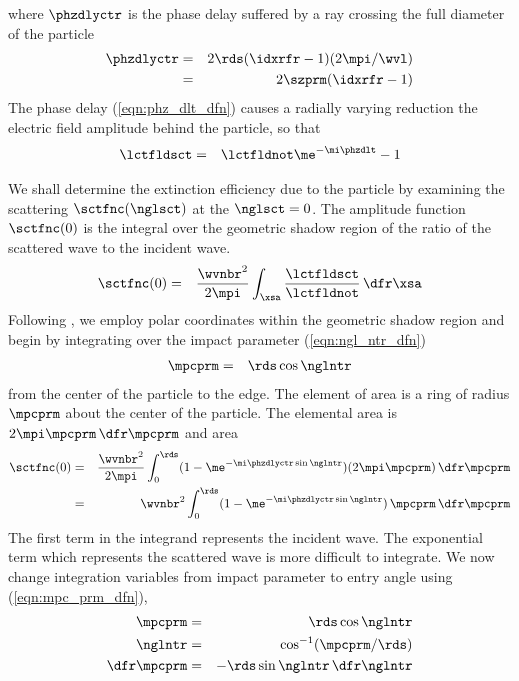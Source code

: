 \documentclass[12pt]{article}
\begin{document}
where $\phzdlyctr$ is the phase delay suffered by a ray crossing the
full diameter of the particle
\begin{eqnarray}
\phzdlyctr & = & 2 \rds (\idxrfr - 1 ) (2 \mpi / \wvl) \nonumber \\
& = & 2 \szprm (\idxrfr - 1 )
\label{eqn:phz_dly_ctr}
\end{eqnarray}
The phase delay (\ref{eqn:phz_dlt_dfn}) causes a radially varying
reduction the electric field amplitude behind the particle, so that
\begin{eqnarray}
\lctfldsct & = & \lctfldnot \me^{-\mi \phzdlt} - 1
\label{eqn:lct_fld_sct_adt_dfn}
\end{eqnarray}

We shall determine the extinction efficiency due to the particle
by examining the scattering  
$\sctfnc(\nglsct)$ at the  $\nglsct = 0$.
The amplitude function $\sctfnc(0)$ is the integral over the geometric
shadow region of the ratio of the scattered wave to the incident wave.
\begin{eqnarray}
\sctfnc(0) & = & \frac{\wvnbr^{2}}{2\mpi} 
\int_{\xsa} \frac{\lctfldsct}{\lctfldnot} \,\dfr \xsa \nonumber
\label{eqn:sct_fnc_dfn}
\end{eqnarray}
Following \cite{Van57}, we employ polar coordinates within the
geometric shadow region and begin by integrating over the impact
parameter (\ref{eqn:ngl_ntr_dfn})
\begin{eqnarray}
\mpcprm & = & \rds \cos \nglntr \nonumber
\label{eqn:mpc_prm_dfn}
\end{eqnarray}
from the center of the particle to the edge.
The element of area is a ring of radius $\mpcprm$ about the center of
the particle.
The elemental area is $2\mpi\mpcprm\,\dfr\mpcprm$ and area 
\begin{eqnarray}
\sctfnc(0)
& = & \frac{\wvnbr^{2}}{2\mpi} 
\int_{0}^{\rds} (1 - \me^{-\mi \phzdlyctr \sin \nglntr})
(2 \mpi \mpcprm) \,\dfr \mpcprm \nonumber \\
& = & \wvnbr^{2}
\int_{0}^{\rds} (1 - \me^{-\mi \phzdlyctr \sin \nglntr})
\,\mpcprm \,\dfr \mpcprm
\label{eqn:adt_dfn}
\end{eqnarray}
The first term in the integrand represents the incident wave.
The exponential term which represents the scattered wave is more
difficult to integrate. 
We now change integration variables from impact parameter to entry
angle using (\ref{eqn:mpc_prm_dfn}),
\begin{eqnarray}
\mpcprm & = & \rds \cos \nglntr \nonumber \\
\nglntr & = & \cos^{-1} (\mpcprm / \rds) \nonumber \\
\dfr \mpcprm & = & - \rds \sin \nglntr \,\dfr \nglntr \nonumber
\label{eqn:cov_mpc_prm_dfn}
\end{eqnarray}
\end{document}
